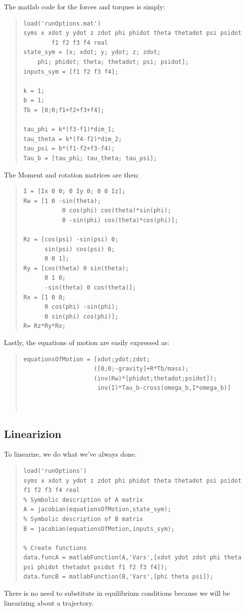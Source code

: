 \documentclass[12pt]{article}
\begin{document}
The matlab code for the forces and torques is simply:
\begin{quote}
\begin{lstlisting}
load('runOptions.mat')
syms x xdot y ydot z zdot phi phidot theta thetadot psi psidot 
     	f1 f2 f3 f4 real
state_sym = [x; xdot; y; ydot; z; zdot; 
	phi; phidot; theta; thetadot; psi; psidot];
inputs_sym = [f1 f2 f3 f4];

k = 1;
b = 1;
Tb = [0;0;f1+f2+f3+f4];

tau_phi = k*(f3-f1)*dim_1;
tau_theta = k*(f4-f2)*dim_2;
tau_psi = b*(f1-f2+f3-f4);
Tau_b = [tau_phi; tau_theta; tau_psi];

\end{lstlisting}
\end{quote}
\clearpage
The Moment and rotation matrices are then:
\begin{quote}
\begin{lstlisting}
I = [Ix 0 0; 0 Iy 0; 0 0 Iz];
Rw = [1 0 -sin(theta); 
           0 cos(phi) cos(theta)*sin(phi); 
           0 -sin(phi) cos(theta)*cos(phi)];

Rz = [cos(psi) -sin(psi) 0;
      sin(psi) cos(psi) 0;
      0 0 1];
Ry = [cos(theta) 0 sin(theta);
      0 1 0;
      -sin(theta) 0 cos(theta)];
Rx = [1 0 0;
      0 cos(phi) -sin(phi);
      0 sin(phi) cos(phi)];
R= Rz*Ry*Rx;  

\end{lstlisting}
\end{quote}
Lastly, the equations of motion are easily expressed as:
\begin{quote}
\begin{lstlisting}
equationsOfMotion = [xdot;ydot;zdot;
                    ([0;0;-gravity]+R*Tb/mass);
                    (inv(Rw)*[phidot;thetadot;psidot]);
                     inv(I)*Tau_b-cross(omega_b,I*omega_b)]
                     
                     
\end{lstlisting}
\end{quote}


\subsection{Linearizion}
To linearize, we do what we've always done. 
\begin{quote}
\begin{lstlisting}
load('runOptions')
syms x xdot y ydot z zdot phi phidot theta thetadot psi psidot f1 f2 f3 f4 real
% Symbolic description of A matrix
A = jacobian(equationsOfMotion,state_sym);
% Symbolic description of B matrix
B = jacobian(equationsOfMotion,inputs_sym);

% Create functions
data.funcA = matlabFunction(A,'Vars',[xdot ydot zdot phi theta psi phidot thetadot psidot f1 f2 f3 f4]);
data.funcB = matlabFunction(B,'Vars',[phi theta psi]);

\end{lstlisting}
\end{quote}
There is no need to substitute in equilibrium conditions because we will be linearizing about a trajectory.
\end{document}
